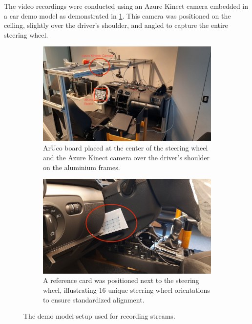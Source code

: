 The video recordings were conducted using an Azure Kinect camera 
embedded in a car demo model as demonstrated in \cref{fig:demo_model}. 
This camera was positioned on the ceiling, slightly over the driver’s 
shoulder, and angled to capture the entire steering wheel. 

\begin{figure}[ht]
    \centering
    \begin{subfigure}[t]{0.45\textwidth}
        \centering
        \includegraphics[width=\textwidth]{media/chapter 3/demo_model.jpg}
        \caption{ArUco board placed at the center of the steering wheel 
        and the Azure Kinect camera over the driver's shoulder 
        on the aluminium frames.}
        \label{fig:demo_model}
    \end{subfigure}\hfill
    \begin{subfigure}[t]{0.45\textwidth}
        \centering
        \includegraphics[width=\textwidth]{media/chapter 3/reference_board.jpg}
        \caption{A reference card was positioned next to the 
        steering wheel, illustrating 16 unique steering wheel orientations 
        to ensure standardized alignment.}
        \label{fig:reference_board}
    \end{subfigure}
    \caption{The demo model setup used for recording streams.}
\end{figure}

